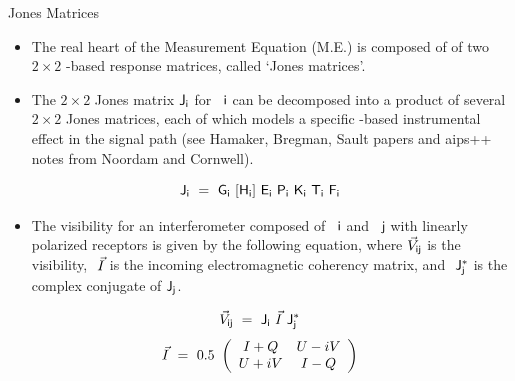 \documentclass[pdf,azure,slideColor,colorBG]{prosper}
\begin{document}

\begin{slide}{Jones Matrices}
\begin{small}
\begin{itemize}
\item The real heart of the Measurement Equation (M.E.) is composed of
 of two $2\times2$ \Station-based response matrices, called `Jones matrices'.
\item The $2\times2$ Jones matrix ${\sf J}_{{\sf i}}$ for \Station\ ${\sf i}$ can
be decomposed into a product of several $2\times2$ Jones matrices,
each of which models a specific \Station-based instrumental effect in
the signal path (see Hamaker, Bregman, Sault papers and aips++ notes 
from Noordam and Cornwell).
\end{itemize}
\begin{displaymath}
  {\sf J}_{{\sf i}} 
  ~= 
  ~{\sf G}_{{\sf i}} 
  ~[{\sf H}_{{\sf i}}] 
  ~{\sf E}_{{\sf i}} 
  ~{\sf P}_{{\sf i}} 
  ~{\sf K}_{{\sf i}}
  ~{\sf T}_{{\sf i}}  
  ~{\sf F}_{{\sf i}} 
  \label{eq:mjJones}
\end{displaymath}
\begin{itemize}
\item The visibility for an interferometer composed of
 \Station\ ${\sf i}$ and \Station\ ${\sf j}$ with linearly polarized receptors is given by the following 
 equation, where ${\vec{V}}_{{\sf i}{\sf j}}$ is the visibility, $~{\vec{I}}$ is the 
 incoming electromagnetic coherency matrix,
 and $~{\sf J}_{{\sf j}}^\ast$ is the complex conjugate of ${\sf J}_{{\sf j}}$. 
\end{itemize}
\begin{displaymath}
  {\vec{V}}_{{\sf i}{\sf j}} 
  ~= 
  ~{\sf J}_{{\sf i}} 
  ~{\vec{I}}
  ~{\sf J}_{{\sf j}}^\ast
  \label{eq:mjJones}
\end{displaymath}
\begin{displaymath}
  {\vec{I}}
  ~=
  ~0.5
  ~\left(\begin{array}{cc}I+Q & U-iV\\ U+iV & I-Q \end{array}\right)
\end{displaymath}
\end{small}
\end{slide}                             

\end{document}
